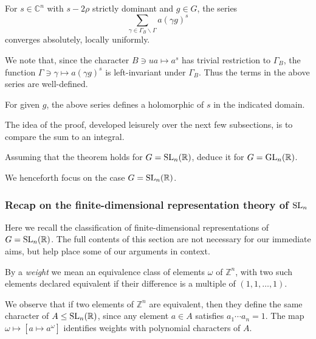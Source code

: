 \documentclass[reqno]{amsart} 
\begin{document}
\begin{theorem}\label{thm:convergence-eisenstein-series}
  For $s \in \mathbb{C}^n$ with $s - 2 \rho$ strictly dominant and $g \in G$, the series
  \begin{equation*}
    \sum _{\gamma \in \Gamma_B \backslash \Gamma } a(\gamma g)^{s}
  \end{equation*}
  converges absolutely, locally uniformly.
\end{theorem}
We note that, since the character $B \ni u a \mapsto a^s$ has trivial restriction to $\Gamma_B$, the function $\Gamma \ni \gamma \mapsto a(\gamma g)^s$ is left-invariant under $\Gamma_B$.  Thus the terms in the above series are well-defined.

\begin{corollary}
  For given $g$, the above series defines a holomorphic of $s$ in the indicated domain.
\end{corollary}

The idea of the proof, developed leisurely over the next few subsections, is to compare the sum to an integral.

\begin{exercise}
  Assuming that the theorem holds for $G = \operatorname{SL}_n(\mathbb{R})$, deduce it for $G = \operatorname{GL}_n(\mathbb{R})$.
\end{exercise}

We henceforth focus on the case $G = \operatorname{SL}_n(\mathbb{R})$.


\subsubsection{Recap on the finite-dimensional representation theory of $\operatorname{SL}_n$}\label{sec:recap-finite-dimens}

Here we recall the classification of finite-dimensional representations of $G = \operatorname{SL}_n(\mathbb{R})$.  The full contents of this section are not necessary for our immediate aims, but help place some of our arguments in context.

\begin{definition}
  By a \emph{weight} we mean an equivalence class of elements $\omega$ of $\mathbb{Z}^n$, with two such elements declared equivalent if their difference is a multiple of $(1,1,\dotsc,1)$.
\end{definition}
We observe that if two elements of $\mathbb{Z}^n$ are equivalent, then they define the same character of $A \leq \operatorname{SL}_n(\mathbb{R})$, since any element $a \in A$ satisfies $a_1 \dotsb a_n = 1$.  The map $\omega \mapsto [a \mapsto a^\omega]$ identifies weights with polynomial characters of $A$.
\end{document}
